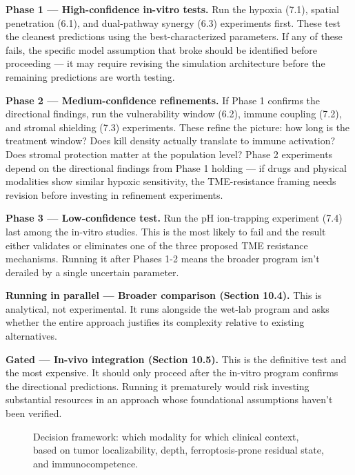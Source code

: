 \documentclass[11pt,twoside,openright]{report}
\begin{document}
\textbf{Phase 1 --- High-confidence in-vitro tests.} Run the hypoxia (7.1), spatial penetration (6.1), and dual-pathway synergy (6.3) experiments first. These test the cleanest predictions using the best-characterized parameters. If any of these fails, the specific model assumption that broke should be identified before proceeding --- it may require revising the simulation architecture before the remaining predictions are worth testing.

\textbf{Phase 2 --- Medium-confidence refinements.} If Phase 1 confirms the directional findings, run the vulnerability window (6.2), immune coupling (7.2), and stromal shielding (7.3) experiments. These refine the picture: how long is the treatment window? Does kill density actually translate to immune activation? Does stromal protection matter at the population level? Phase 2 experiments depend on the directional findings from Phase 1 holding --- if drugs and physical modalities show similar hypoxic sensitivity, the TME-resistance framing needs revision before investing in refinement experiments.

\textbf{Phase 3 --- Low-confidence test.} Run the pH ion-trapping experiment (7.4) last among the in-vitro studies. This is the most likely to fail and the result either validates or eliminates one of the three proposed TME resistance mechanisms. Running it after Phases 1-2 means the broader program isn't derailed by a single uncertain parameter.

\textbf{Running in parallel --- Broader comparison (Section 10.4).} This is analytical, not experimental. It runs alongside the wet-lab program and asks whether the entire approach justifies its complexity relative to existing alternatives.

\textbf{Gated --- In-vivo integration (Section 10.5).} This is the definitive test and the most expensive. It should only proceed after the in-vitro program confirms the directional predictions. Running it prematurely would risk investing substantial resources in an approach whose foundational assumptions haven't been verified.

\begin{figure}[tbp]
\setcounter{figure}{18}
\caption{Decision framework: which modality for which clinical context, based on tumor localizability, depth, ferroptosis-prone residual state, and immunocompetence.}
\label{fig:fig22_decision_flowchart}
\end{figure}
\end{document}
